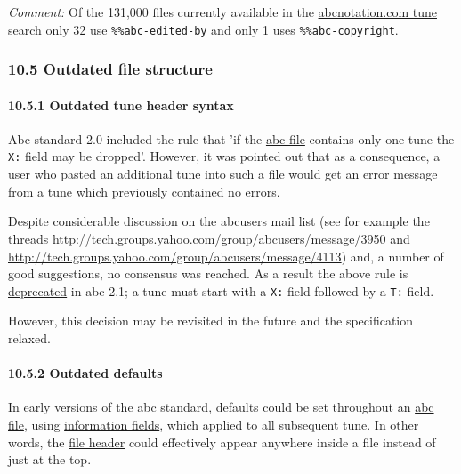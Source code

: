 \emph{Comment:} Of the 131,000 files currently available in the
\href{http://abcnotation.com/search}{abcnotation.com tune search} only
32 use \texttt{\%\%abc-edited-by} and only 1 uses
\texttt{\%\%abc-copyright}.

\hypertarget{outdated_file_structure}{\subsubsection{10.5 Outdated file
structure}\label{outdated_file_structure}}

\hypertarget{outdated_tune_header_syntax}{\paragraph{10.5.1 Outdated
tune header syntax}\label{outdated_tune_header_syntax}}

Abc standard 2.0 included the rule that 'if the
\protect\hyperlink{abc_file_definition}{abc file} contains only one tune
the \texttt{X:} field may be dropped'. However, it was pointed out that
as a consequence, a user who pasted an additional tune into such a file
would get an error message from a tune which previously contained no
errors.

Despite considerable discussion on the abcusers mail list (see for
example the threads
\url{http://tech.groups.yahoo.com/group/abcusers/message/3950} and
\url{http://tech.groups.yahoo.com/group/abcusers/message/4113}) and, a
number of good suggestions, no consensus was reached. As a result the
above rule is \protect\hyperlink{outdated_syntax}{deprecated} in abc
2.1; a tune must start with a \texttt{X:} field followed by a
\texttt{T:} field.

However, this decision may be revisited in the future and the
specification relaxed.

\hypertarget{outdated_defaults}{\paragraph{10.5.2 Outdated
defaults}\label{outdated_defaults}}

In early versions of the abc standard, defaults could be set throughout
an \protect\hyperlink{abc_file_definition}{abc file}, using
\protect\hyperlink{information_field_definition}{information fields},
which applied to all subsequent tune. In other words, the
\protect\hyperlink{file_header_definition}{file header} could
effectively appear anywhere inside a file instead of just at the top.

